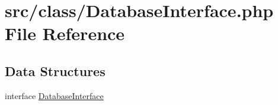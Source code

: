 \hypertarget{_database_interface_8php}{}\section{src/class/\+Database\+Interface.php File Reference}
\label{_database_interface_8php}
\subsection*{Data Structures}
\begin{DoxyCompactItemize}
\item 
interface \hyperlink{interface_database_interface}{Database\+Interface}
\end{DoxyCompactItemize}
